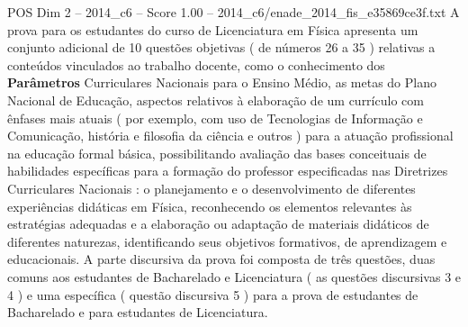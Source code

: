 \begin{textsample}{POS Dim 2 – 2014\_c6 – Score 1.00 – 2014\_c6/enade\_2014\_fis\_e35869ce3f.txt}
A prova para os estudantes do curso de Licenciatura em Física apresenta um conjunto adicional de 10 questões objetivas ( de números 26 a 35 ) relativas a conteúdos vinculados ao trabalho docente, como o conhecimento dos \textbf{Parâmetros} Curriculares Nacionais para o Ensino Médio, as metas do Plano Nacional de Educação, aspectos relativos à elaboração de um currículo com ênfases mais atuais ( por exemplo, com uso de Tecnologias de Informação e Comunicação, história e filosofia da ciência e outros ) para a atuação profissional na educação formal básica, possibilitando avaliação das bases conceituais de habilidades específicas para a formação do professor especificadas nas Diretrizes Curriculares Nacionais : o planejamento e o desenvolvimento de diferentes experiências didáticas em Física, reconhecendo os elementos relevantes às estratégias adequadas e a elaboração ou adaptação de materiais didáticos de diferentes naturezas, identificando seus objetivos formativos, de aprendizagem e educacionais.
A parte discursiva da prova foi composta de três questões, duas comuns aos estudantes de Bacharelado e Licenciatura ( as questões discursivas 3 e 4 ) e uma específica ( questão discursiva 5 ) para a prova de estudantes de Bacharelado e para estudantes de Licenciatura.

\end{textsample}
